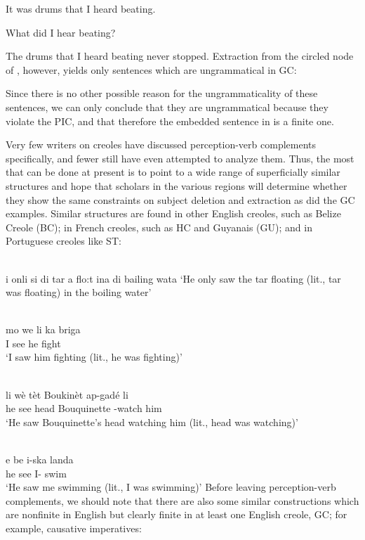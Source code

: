 \ea\label{ex:2:143}
 It was drums that I heard beating.
\z

\ea\label{ex:2:144}
 What did I hear beating?
\z

\ea\label{ex:2:145}
 The drums that I heard beating never stopped.
\z
Extraction from the circled node of , however, yields only sentences which are ungrammatical in GC:

\z

\z

\z
Since there is no other possible reason for the ungrammaticality of these sentences, we can only conclude that they are ungrammatical because they violate the PIC, and that therefore the embedded sentence in  is a finite one.


Very few writers on creoles have discussed perception-verb com\-plements specifically, and fewer still have even attempted to analyze them. Thus, the most that can be done at present is to point to a wide range of superficially similar structures and hope that scholars in the various regions will determine whether they show the same constraints on subject deletion and extraction as did the GC examples. Similar structures are found in other English creoles, such as Belize Creole (BC); in French creoles, such as HC and Guyanais (GU); and in Portuguese creoles like ST:

\ea\label{ex:2:149}
\langinfo{\langBC}{}{}\\
i onli si di tar a flo:t ina di bailing wata
\glt `He only saw the tar floating (lit., tar was floating) in the boiling water'
\z

\ea\label{ex:2:150}
\langinfo{\langGU}{}{}\\
 \gll mo we li ka briga\\
I see he {\ASP} fight\\
\glt `I saw him fighting (lit., he was fighting)'
\z

\ea\label{ex:2:151}
\langinfo{\langHC}{}{}\\
\gll li wè tèt Boukinèt ap-gadé li\\
he see head Bouquinette \ASP-watch him \\
\glt `He saw Bouquinette's head watching him (lit., head was watching)'
\z

\ea\label{ex:2:152}
\langinfo{\langST}{}{}\\
\gll e be i-ska landa\\
he see {I-\ASP} swim\\
\glt `He saw me swimming (lit., I was swimming)'
\z
Before leaving perception-verb complements, we should note that there are also some similar constructions which are nonfinite in English but clearly finite in at least one English creole, GC; for example, causative imperatives:

